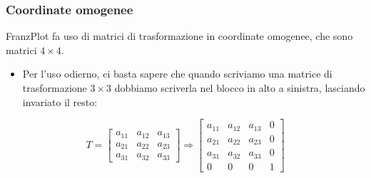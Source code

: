 \documentclass{beamer}
\newcommand{\frnzplt}{FranzPlot }
\begin{document}
\begin{frame}
\frametitle{Coordinate omogenee}
\frnzplt fa uso di matrici di trasformazione in coordinate omogenee, che sono matrici $4 \times 4$.
    \begin{itemize}
        \item Per l'uso odierno, ci basta sapere che quando scriviamo una matrice di trasformazione $3 \times 3$
            dobbiamo scriverla nel blocco in alto a sinistra, lasciando invariato il resto:
    \end{itemize}
\begin{displaymath}
    T = 
\begin{bmatrix}
a_{11} & a_{12} & a_{13} \\
a_{21} & a_{22} & a_{23} \\
a_{31} & a_{32} & a_{33}
\end{bmatrix}
\Rightarrow
\begin{bmatrix}
a_{11} & a_{12} & a_{13} & 0 \\
a_{21} & a_{22} & a_{23} & 0 \\
a_{31} & a_{32} & a_{33} & 0 \\
0      &    0   &  0     & 1 
\end{bmatrix}
\end{displaymath}
\end{frame}
\end{document}

